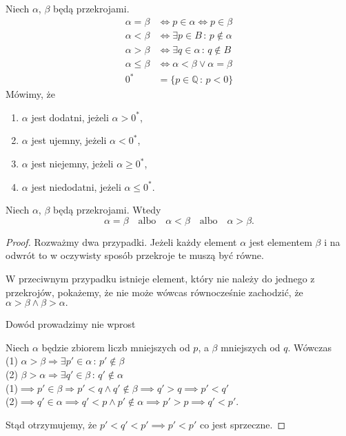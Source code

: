 \begin{definicja}
Niech $\alpha$, $\beta$ będą przekrojami.
\begin{align*}
\alpha = \beta & \iff p\in\alpha \iff p\in\beta \\
\alpha < \beta & \iff \exists p \in B \,: \, p \notin \alpha \\
\alpha > \beta  & \iff \exists q \in \alpha \,:\, q \notin B \\
\alpha \leq \beta & \iff \alpha < \beta \vee \alpha = \beta \\
0^* & = \{ p\in\mathbb{Q} \, : \, p<0 \}
\end{align*}
 Mówimy, że 
\begin{enumerate}
\item[] $\alpha$ jest dodatni, jeżeli $\alpha > 0^*$,
\item[] $\alpha$ jest ujemny, jeżeli $\alpha < 0^*$,
\item[] $\alpha$ jest niejemny, jeżeli $\alpha \geq 0^*$,
\item[] $\alpha$ jest niedodatni, jeżeli $\alpha \leq 0^*$.
\end{enumerate}
\end{definicja}

\begin{twierdzenie}
Niech $\alpha$, $\beta$ będą przekrojami. Wtedy
$$ \alpha = \beta \quad \mbox{albo}\quad \alpha<\beta\quad\mbox{albo}\quad\alpha>\beta.$$
\end{twierdzenie}
	
\begin{proof}
Rozważmy dwa przypadki. Jeżeli każdy element $\alpha$ jest elementem $\beta$ i na odwrót to w oczywisty sposób przekroje te muszą być równe. 

W przeciwnym przypadku istnieje element, który nie należy do jednego z przekrojów, pokażemy, że nie może wówcas równocześnie zachodzić, że $\alpha >\beta \land \beta>\alpha.$


Dowód prowadzimy nie wprost

Niech $\alpha$ będzie zbiorem liczb mniejszych od $p$, a $\beta$ mniejszych od $q$. 
Wówczas\\
(1) $\alpha >\beta \Rightarrow \exists{p'\in \alpha}\,:\,p'\not \in \beta$\\
(2) $\beta >\alpha \Rightarrow \exists{q'\in \beta}\,:\,q'\not \in \alpha$\\
(1)$\implies p'\in \beta \Rightarrow p'<q \land q'\not \in \beta \implies q'>q \implies p'<q'$\\
(2)$\implies q'\in \alpha \implies q'<p \land p'\not \in \alpha \implies p'>p \implies q'<p'$.

 Stąd otrzymujemy, że $p'<q'<p'\implies p'<p'$ co jest sprzeczne.
\end{proof}

























